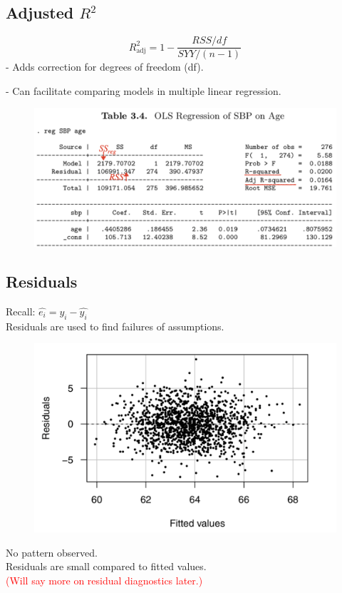\documentclass[14pt]{extarticle}
\begin{document}
\subsection*{Adjusted $R^2$}
\[
R_{\text{adj}}^2 = 1 - \frac{RSS / df}{SYY / (n - 1)}
\]
 - Adds correction for degrees of freedom (df). 

 - Can facilitate comparing models in multiple linear regression.
\begin{figure}[H]
    \centering
    \includegraphics[width=1\textwidth]{fig10.png}
\end{figure}

\newpage

\subsection*{Residuals}
Recall: $\hat{e_i} = y_i - \hat{y_i}$\\
Residuals are used to find failures of assumptions.
\begin{figure}[H]
    \centering
    \includegraphics[width=1\textwidth]{fig11.png}
\end{figure}
\noindent
No pattern observed. \\
Residuals are small compared to fitted values. \\
\textcolor{red}{(Will say more on residual diagnostics later.)}
\end{document}
